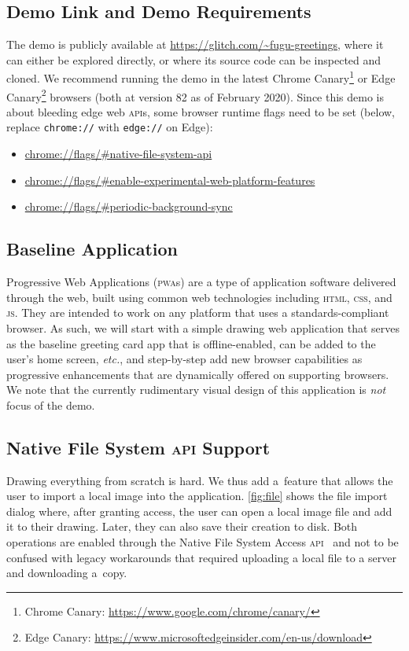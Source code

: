 \documentclass[sigconf]{acmart}
\begin{document}
\subsection{Demo Link and Demo Requirements}

The demo is publicly available at \url{https://glitch.com/~fugu-greetings},
where it can either be explored directly,
or where its source code can be inspected and cloned.
We recommend running the demo in the latest Chrome
Canary\footnote{Chrome Canary: \url{https://www.google.com/chrome/canary/}}
or Edge
Canary\footnote{Edge Canary: \url{https://www.microsoftedgeinsider.com/en-us/download}}
browsers (both at version 82 as of February 2020).
Since this demo is about bleeding edge web \textsc{api}s,
some browser runtime flags need to be set (below, replace \texttt{chrome://}
with \texttt{edge://} on Edge):

\begin{itemize}
  \item \url{chrome://flags/#native-file-system-api}
  \item \url{chrome://flags/#enable-experimental-web-platform-features}  
  \item \url{chrome://flags/#periodic-background-sync}
\end{itemize}

\subsection{Baseline Application}

Progressive Web Applications (\textsc{pwa}s) are a type of application software
delivered through the web, built using common web technologies
including \textsc{html}, \textsc{css}, and \textsc{js}.
They are intended to work on any platform that uses a standards-compliant browser.
As such, we will start with a simple drawing web application
that serves as the baseline greeting card app that is offline-enabled,
can be added to the user's home screen, \textit{etc.},
and step-by-step add new browser capabilities
as progressive enhancements that are dynamically offered on supporting browsers.
We note that the currently rudimentary visual design of this application is \textit{not} focus of the demo.

\subsection{Native File System \textsc{api} Support}

Drawing everything from scratch is hard.
We thus add a~feature that allows the user to import a local image into the application.
\autoref{fig:file} shows the file import dialog where, after granting access,
the user can open a local image file and add it to their drawing.
Later, they can also save their creation to disk.
Both operations are enabled through the Native File System Access \textsc{api}~\cite{kruisselbrink19}
and not to be confused with legacy workarounds that required uploading a local file to a server
and downloading a~copy.
\end{document}

